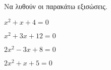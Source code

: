 Να λυθούν οι παρακάτω εξισώσεις.
\begin{multicols}{2}
\begin{alist}
\item $ x^2+x+4=0 $
\item $ x^2+3x+12=0 $
\item $ 2x^2-3x+8=0 $
\item $ 2x^2+x+5=0 $
\end{alist}
\end{multicols}
